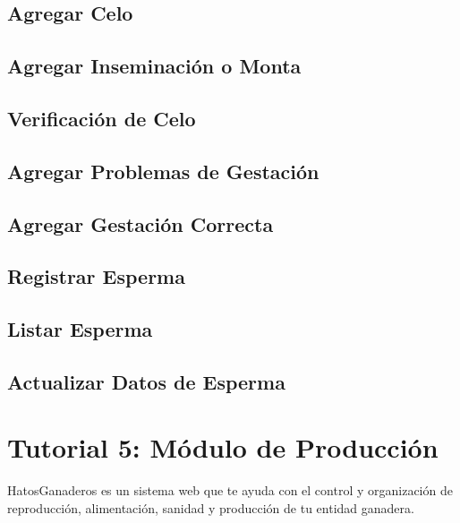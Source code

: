 \documentclass[letterpaper,10pt,spanish]{sphinxmanual}
\begin{document}
\subsection{Agregar Celo}
\label{Tutorial 4: M_xf3dulo de Reproducci_xf3n:agregar-celo}

\subsection{Agregar Inseminación o Monta}
\label{Tutorial 4: M_xf3dulo de Reproducci_xf3n:agregar-inseminacion-o-monta}

\subsection{Verificación de Celo}
\label{Tutorial 4: M_xf3dulo de Reproducci_xf3n:verificacion-de-celo}

\subsection{Agregar Problemas de Gestación}
\label{Tutorial 4: M_xf3dulo de Reproducci_xf3n:agregar-problemas-de-gestacion}

\subsection{Agregar Gestación Correcta}
\label{Tutorial 4: M_xf3dulo de Reproducci_xf3n:agregar-gestacion-correcta}

\subsection{Registrar Esperma}
\label{Tutorial 4: M_xf3dulo de Reproducci_xf3n:registrar-esperma}

\subsection{Listar Esperma}
\label{Tutorial 4: M_xf3dulo de Reproducci_xf3n:listar-esperma}

\subsection{Actualizar Datos de Esperma}
\label{Tutorial 4: M_xf3dulo de Reproducci_xf3n:actualizar-datos-de-esperma}

\section{Tutorial 5: Módulo de Producción}
\label{Tutorial 5: M_xf3dulo de Producci_xf3n::doc}\label{Tutorial 5: M_xf3dulo de Producci_xf3n:tutorial-5-modulo-de-produccion}
HatosGanaderos es un sistema web que te ayuda con el control y organización de reproducción, alimentación, sanidad y producción de tu entidad ganadera.
\end{document}
